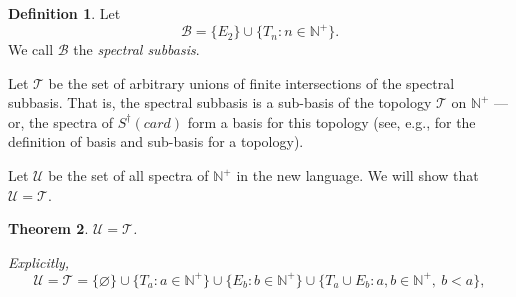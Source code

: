 \documentclass[12pt, reqno]{amsart}
\newtheorem{theorem}{Theorem}[section]
\theoremstyle{definition}
\newtheorem{definition}[theorem]{Definition}
\theoremstyle{remark}
\numberwithin{equation}{section}
\begin{document}
\begin{definition}\label{basis}
Let
\[
\mathcal B
=
\{E_2\}\cup\{T_n:n\in\mathbb{N}^+\}.
\]
We call $\mathcal B$ the \emph{spectral subbasis}.
\end{definition}


Let $\mathcal{T}$ be the set of arbitrary unions of finite intersections of the spectral subbasis. That is, the spectral subbasis is a sub-basis of the topology $\mathcal{T}$ on $\mathbb{N}^+$ --- or, the spectra of $S^{\dagger}(card)$ form a basis for this topology (see, e.g., \cite{topology} for the definition of basis and sub-basis for a topology).


Let $\mathcal{U}$ be the set of all spectra of $\mathbb{N}^+$ in the new language. We will show that $\mathcal{U} = \mathcal{T}$.

\begin{theorem}\label{topology_thm}
	$\mathcal{U} = \mathcal{T}$. 
	
	Explicitly,
	\[
	\mathcal{U} = \mathcal{T} = \{\varnothing\}
	\cup \{T_a : a \in \mathbb{N}^+\}
	\cup \{E_b : b \in \mathbb{N}^+\}
	\cup \{T_a \cup E_b : a, b \in \mathbb{N}^+,\ b < a\},
	\]
\end{theorem}
\end{document}
